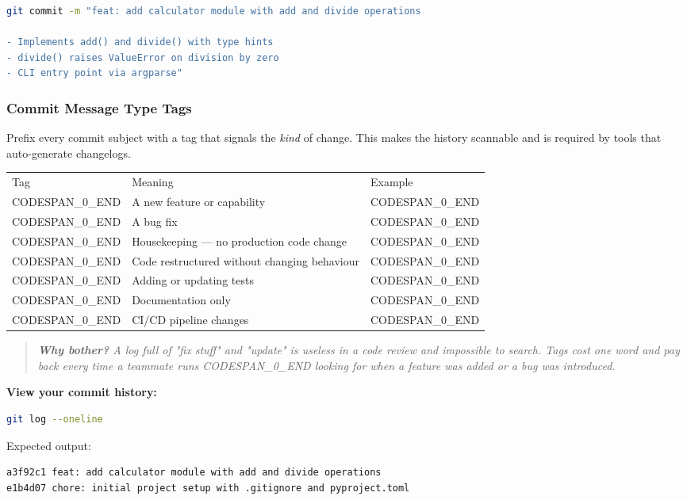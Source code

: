 \documentclass[11pt,a4paper]{book}
\begin{document}
\begin{lstlisting}[language=Bash]
git commit -m "feat: add calculator module with add and divide operations

- Implements add() and divide() with type hints
- divide() raises ValueError on division by zero
- CLI entry point via argparse"
\end{lstlisting}

\subsubsection{Commit Message Type Tags}

Prefix every commit subject with a tag that signals the \textit{kind} of change. This makes the history scannable and is required by tools that auto-generate changelogs.

\begin{tabular}{lll}
\hline
Tag & Meaning & Example \\
CODESPAN\_0\_END & A new feature or capability & CODESPAN\_0\_END \\
CODESPAN\_0\_END & A bug fix & CODESPAN\_0\_END \\
CODESPAN\_0\_END & Housekeeping --- no production code change & CODESPAN\_0\_END \\
CODESPAN\_0\_END & Code restructured without changing behaviour & CODESPAN\_0\_END \\
CODESPAN\_0\_END & Adding or updating tests & CODESPAN\_0\_END \\
CODESPAN\_0\_END & Documentation only & CODESPAN\_0\_END \\
CODESPAN\_0\_END & CI/CD pipeline changes & CODESPAN\_0\_END \\
\hline
\end{tabular}

\begin{quote}
\textit{\textbf{Why bother?} A log full of "fix stuff" and "update" is useless in a code review and impossible to search. Tags cost one word and pay back every time a teammate runs CODESPAN\_0\_END looking for when a feature was added or a bug was introduced.}
\end{quote}

\textbf{View your commit history:}

\begin{lstlisting}[language=Bash]
git log --oneline
\end{lstlisting}

Expected output:

\begin{lstlisting}
a3f92c1 feat: add calculator module with add and divide operations
e1b4d07 chore: initial project setup with .gitignore and pyproject.toml
\end{lstlisting}
\end{document}
